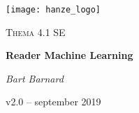 \begin{titlepage}
	\centering
	\texttt{[image: hanze\_logo]}\par\vspace{1cm}
	\vspace{4cm}
	{\scshape\Large Thema 4.1 SE\par}
	\vspace{1.5cm}
	{\huge\bfseries Reader Machine Learning\par}
	\vspace{2cm}
	{\Large\itshape Bart Barnard\par}
	\vfill
	
	{\large v2.0 – september 2019\par}
\end{titlepage}

\tableofcontents
\newpage